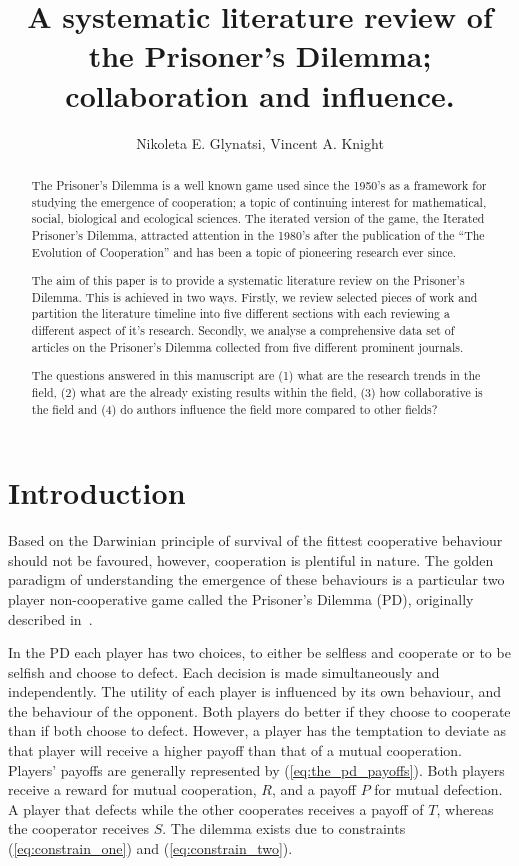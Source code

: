 \documentclass{article}
\title{A systematic literature review of the Prisoner's Dilemma; collaboration and influence.}
\author{Nikoleta E. Glynatsi, Vincent A. Knight}
\date{}
\theoremstyle{definition}
\begin{document}
\maketitle

\begin{abstract}
    The Prisoner's Dilemma is a well known game used since the 1950's as a
    framework for studying the emergence of cooperation; a topic of continuing
    interest for mathematical, social, biological and ecological sciences. The
    iterated version of the game, the Iterated Prisoner's Dilemma, attracted
    attention in the 1980's after the publication of the ``The Evolution of
    Cooperation'' and has been a topic of pioneering research ever since.

    The aim of this paper is to provide a systematic literature review on the
    Prisoner's Dilemma. This is achieved in two ways.
    Firstly, we review selected pieces of work and partition the literature
    timeline into five different sections with each reviewing a different
    aspect of it's research. Secondly, we
    analyse a comprehensive data set of articles on the
    Prisoner's Dilemma collected from five different prominent journals.

    The questions answered in this manuscript are (1) what are the research trends
    in the field, (2) what are the already existing results within the field,
    (3) how collaborative is the field and (4) do authors influence the field more
    compared to other fields?
\end{abstract}

\section{Introduction}\label{section:introduction}

Based on the Darwinian principle of survival of the fittest cooperative behaviour
should not be favoured, however, cooperation is plentiful in nature.
The golden paradigm of understanding the emergence of these behaviours is
a particular two player non-cooperative game called the Prisoner's Dilemma (PD),
originally described in~\cite{Flood1958}.

In the PD each player has two choices, to either be selfless and cooperate or to
be selfish and choose to defect. Each decision is made simultaneously and
independently. The utility of each player is influenced by its own behaviour,
and the behaviour of the opponent. Both players do better if they choose to
cooperate than if both choose to defect. However, a player has the temptation to
deviate as that player will receive a higher payoff than that of a mutual
cooperation.
Players' payoffs are generally represented by (\ref{eq:the_pd_payoffs}). Both
players receive a reward for mutual cooperation, \(R\), and a payoff \(P\) for
mutual defection. A player that defects while the other cooperates receives a payoff of
\(T\), whereas the cooperator receives \(S\). The dilemma exists due
to constraints (\ref{eq:constrain_one}) and (\ref{eq:constrain_two}).
\end{document}
